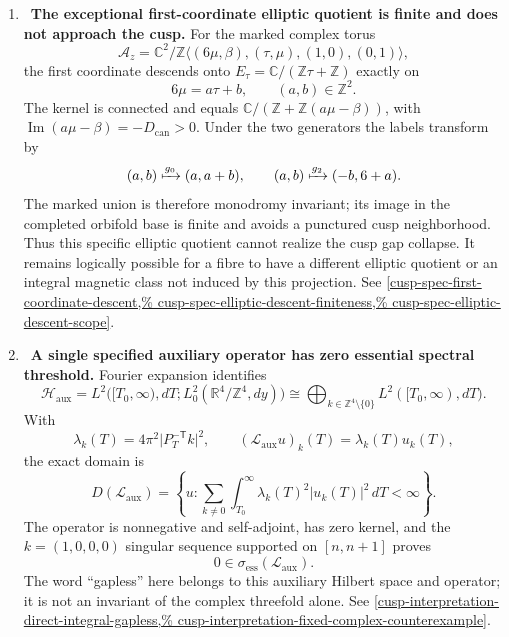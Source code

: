 \begin{enumerate}[leftmargin=1.8em,itemsep=.65em]
\item \Verified\ \textbf{The exceptional first-coordinate elliptic quotient
is finite and does not approach the cusp.}
For the marked complex torus
\[
 \mathcal A_z=\mathbb C^2/
 \mathbb Z\langle(6\mu,\beta),(\tau,\mu),(1,0),(0,1)\rangle,
\]
the first coordinate descends onto
\(E_\tau=\mathbb C/(\mathbb Z\tau+\mathbb Z)\) exactly on
\[
 6\mu=a\tau+b,\qquad(a,b)\in\mathbb Z^2.
\]
The kernel is connected and equals
\(\mathbb C/(\mathbb Z+\mathbb Z(a\mu-\beta))\), with
\(\operatorname{Im}(a\mu-\beta)=-D_{\mathrm{can}}>0\).  Under the two
generators the labels transform by
\[
 (a,b)\xmapsto{g_0}(a,a+b),\qquad
 (a,b)\xmapsto{g_2}(-b,6+a).
\]
The marked union is therefore monodromy invariant; its image in the completed
orbifold base is finite and avoids a punctured cusp neighborhood.  Thus this
specific elliptic quotient cannot realize the cusp gap collapse.  It remains
logically possible for a fibre to have a different elliptic quotient or an
integral magnetic class not induced by this projection.  See
\cref{cusp-spec-first-coordinate-descent,%
cusp-spec-elliptic-descent-finiteness,%
cusp-spec-elliptic-descent-scope}.

\item \Verified\ \textbf{A single specified auxiliary operator has
zero essential spectral threshold.}
Fourier expansion identifies
\[
 \mathscr H_{\mathrm{aux}}
 =L^2\bigl([T_0,\infty),dT;
 L^2_0(\mathbb R^4/\mathbb Z^4,dy)\bigr)
 \cong\bigoplus_{k\in\mathbb Z^4\setminus\{0\}}
 L^2([T_0,\infty),dT).
\]
With
\[
 \lambda_k(T)=4\pi^2\lvert P_T^{-\mathsf T}k\rvert^2,\qquad
 (\mathscr L_{\mathrm{aux}}u)_k(T)=\lambda_k(T)u_k(T),
\]
the exact domain is
\[
 D(\mathscr L_{\mathrm{aux}})=\left\{u:
 \sum_{k\ne0}\int_{T_0}^{\infty}
 \lambda_k(T)^2\lvert u_k(T)\rvert^2\,dT<\infty\right\}.
\]
The operator is nonnegative and self-adjoint, has zero kernel, and the
\(k=(1,0,0,0)\) singular sequence supported on \([n,n+1]\) proves
\[
 0\in\sigma_{\mathrm{ess}}(\mathscr L_{\mathrm{aux}}).
\]
The word ``gapless'' here belongs to this auxiliary Hilbert space and
operator; it is not an invariant of the complex threefold alone.  See
\cref{cusp-interpretation-direct-integral-gapless,%
cusp-interpretation-fixed-complex-counterexample}.


\end{enumerate}
